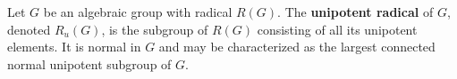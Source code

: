 Let $G$ be an algebraic group with radical $R(G)$. The \textbf{unipotent radical} of $G$, denoted $R_u(G)$, is the subgroup of $R(G)$ consisting of all its unipotent elements. It is normal in $G$ and may be characterized as the largest connected normal unipotent subgroup of $G$.
